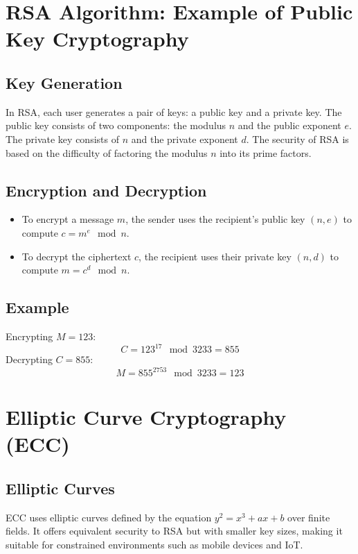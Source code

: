 \documentclass[12pt]{report}
\numberwithin{equation}{chapter}
\begin{document}
\section{RSA Algorithm: Example of Public Key Cryptography}

\subsection{Key Generation}
In RSA, each user generates a pair of keys: a public key and a private key. The public key consists of two components: the modulus \(n\) and the public exponent \(e\). The private key consists of \(n\) and the private exponent \(d\). The security of RSA is based on the difficulty of factoring the modulus \(n\) into its prime factors.

\subsection{Encryption and Decryption}
\begin{itemize}
    \item To encrypt a message \(m\), the sender uses the recipient’s public key \( (n, e) \) to compute \( c = m^e \mod n \).
    \item To decrypt the ciphertext \(c\), the recipient uses their private key \( (n, d) \) to compute \( m = c^d \mod n \).
\end{itemize}

\subsection{Example}
Encrypting \( M = 123 \):
\[
C = 123^{17} \mod 3233 = 855
\]
Decrypting \( C = 855 \):
\[
M = 855^{2753} \mod 3233 = 123
\]

\section{Elliptic Curve Cryptography (ECC)}

\subsection{Elliptic Curves}
ECC uses elliptic curves defined by the equation \( y^2 = x^3 + ax + b \) over finite fields. It offers equivalent security to RSA but with smaller key sizes, making it suitable for constrained environments such as mobile devices and IoT.
\end{document}
